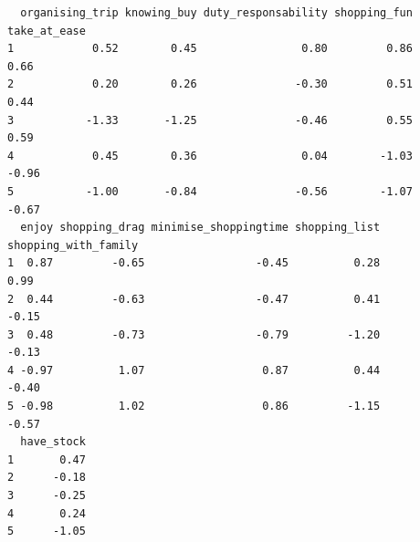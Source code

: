 \documentclass[
  11pt,
]{article}
\newenvironment{Shaded}{\begin{snugshade}}{\end{snugshade}}
\newcommand{\AttributeTok}[1]{\textcolor[rgb]{0.77,0.63,0.00}{#1}}
\newcommand{\CommentTok}[1]{\textcolor[rgb]{0.56,0.35,0.01}{\textit{#1}}}
\newcommand{\ConstantTok}[1]{\textcolor[rgb]{0.00,0.00,0.00}{#1}}
\newcommand{\DecValTok}[1]{\textcolor[rgb]{0.00,0.00,0.81}{#1}}
\newcommand{\FunctionTok}[1]{\textcolor[rgb]{0.00,0.00,0.00}{#1}}
\newcommand{\NormalTok}[1]{#1}
\newcommand{\OtherTok}[1]{\textcolor[rgb]{0.56,0.35,0.01}{#1}}
\newcommand{\SpecialCharTok}[1]{\textcolor[rgb]{0.00,0.00,0.00}{#1}}
\newcommand{\StringTok}[1]{\textcolor[rgb]{0.31,0.60,0.02}{#1}}
\begin{document}
\begin{Shaded}
\end{Shaded}

\begin{verbatim}
  organising_trip knowing_buy duty_responsability shopping_fun take_at_ease
1            0.52        0.45                0.80         0.86         0.66
2            0.20        0.26               -0.30         0.51         0.44
3           -1.33       -1.25               -0.46         0.55         0.59
4            0.45        0.36                0.04        -1.03        -0.96
5           -1.00       -0.84               -0.56        -1.07        -0.67
  enjoy shopping_drag minimise_shoppingtime shopping_list shopping_with_family
1  0.87         -0.65                 -0.45          0.28                 0.99
2  0.44         -0.63                 -0.47          0.41                -0.15
3  0.48         -0.73                 -0.79         -1.20                -0.13
4 -0.97          1.07                  0.87          0.44                -0.40
5 -0.98          1.02                  0.86         -1.15                -0.57
  have_stock
1       0.47
2      -0.18
3      -0.25
4       0.24
5      -1.05
\end{verbatim}
\end{document}
